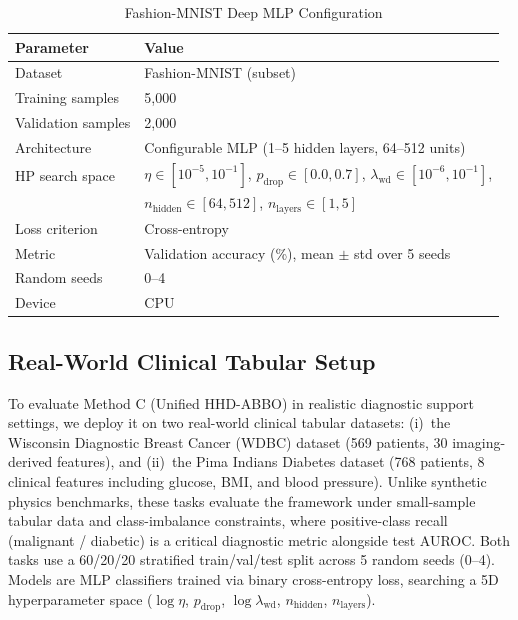 \documentclass[11pt]{article}
\theoremstyle{definition}
\begin{document}
\begin{table}[H]
\centering
\caption{Fashion-MNIST Deep MLP Configuration}
\label{tab:fmnist_setup}
\renewcommand{\arraystretch}{1.2}
\begin{tabular}{ll}
\toprule
Parameter & Value \\
\midrule
Dataset              & Fashion-MNIST (subset) \\
Training samples     & 5,000 \\
Validation samples   & 2,000 \\
Architecture         & Configurable MLP (1--5 hidden layers, 64--512 units) \\
HP search space      & $\eta\in[10^{-5},10^{-1}]$,
                       $p_{\mathrm{drop}}\in[0.0,0.7]$,
                       $\lambda_{\mathrm{wd}}\in[10^{-6},10^{-1}]$, \\
                     & $n_{\mathrm{hidden}}\in[64,512]$,
                       $n_{\mathrm{layers}}\in[1,5]$ \\
Loss criterion       & Cross-entropy \\
Metric               & Validation accuracy (\%), mean $\pm$ std over 5 seeds \\
Random seeds         & 0--4 \\
Device               & CPU \\
\bottomrule
\end{tabular}
\end{table}

\subsection{Real-World Clinical Tabular Setup}

To evaluate Method C (Unified HHD-ABBO) in realistic diagnostic support settings, we deploy it on two real-world clinical tabular datasets: (i)~the Wisconsin Diagnostic Breast Cancer (WDBC) dataset (569 patients, 30 imaging-derived features), and (ii)~the Pima Indians Diabetes dataset (768 patients, 8 clinical features including glucose, BMI, and blood pressure). Unlike synthetic physics benchmarks, these tasks evaluate the framework under small-sample tabular data and class-imbalance constraints, where positive-class recall (malignant / diabetic) is a critical diagnostic metric alongside test AUROC. Both tasks use a 60/20/20 stratified train/val/test split across 5 random seeds (0--4). Models are MLP classifiers trained via binary cross-entropy loss, searching a 5D hyperparameter space ($\log\eta$, $p_{\mathrm{drop}}$, $\log\lambda_{\mathrm{wd}}$, $n_{\mathrm{hidden}}$, $n_{\mathrm{layers}}$).
\end{document}
